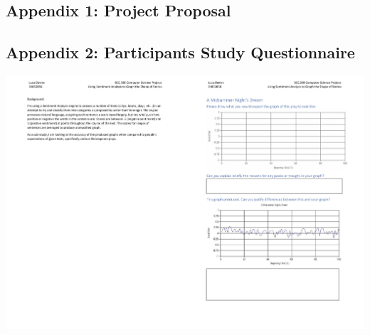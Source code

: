 \documentclass{article}
\begin{document}
    \subsection*{Appendix 1: Project Proposal}
        
    \subsection*{Appendix 2: Participants Study Questionnaire}
        \includegraphics[width=1.5\textwidth, angle=90, origin=c]{Figures/Survey/Questionnaire}
\end{document}
